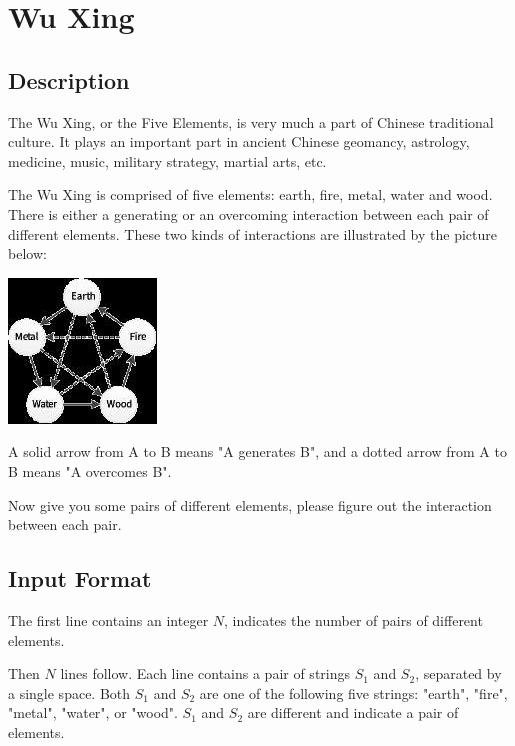 \section{Wu Xing}

\MakeLimits[1000 ms][65536 kB]

\subsection{Description}

The Wu Xing, or the Five Elements, is very much a part of Chinese traditional culture. It plays an important part in ancient Chinese geomancy, astrology, medicine, music, military strategy, martial arts, etc.

The Wu Xing is comprised of five elements: earth, fire, metal, water and wood. There is either a generating or an overcoming interaction between each pair of different elements. These two kinds of interactions are illustrated by the picture below:

\begin{center}
    \includegraphics[]{pics/wuxing.jpeg}
\end{center}

A solid arrow from A to B means "A generates B", and a dotted arrow from A to B means "A overcomes B".

Now give you some pairs of different elements, please figure out the interaction between each pair.

\subsection{Input Format}

The first line contains an integer $N$, indicates the number of pairs of different elements.

Then $N$ lines follow. Each line contains a pair of strings $S_1$ and $S_2$, separated by a single space. Both $S_1$ and $S_2$ are one of the following five strings: "earth", "fire", "metal", "water", or "wood". $S_1$ and $S_2$ are different and indicate a pair of elements.


